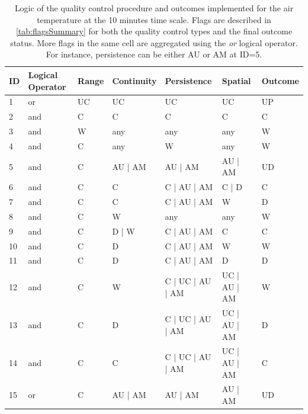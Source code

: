 \documentclass[authoryear,preprint,review,12pt]{elsarticle}
\begin{document}
\begin{table}[]
    \begin{scriptsize}
    \centering
    \begin{tabular}{l l l l l l l}
        \hline
        ID & Logical Operator & Range & Continuity & Persistence      & Spatial      & Outcome \\
        \hline
        1  & or               & UC    & UC         & UC               & UC           & UP \\
        2  & and              & C     & C          & C                & C            & C  \\
        3  & and              & W     & any        & any              & any          & W  \\
        4  & and              & C     & any        & W                & any          & W  \\
        5  & and              & C     & AU | AM    & AU | AM          & AU | AM      & UD \\
        6  & and              & C     & C          & C | AU | AM      & C | D        & C  \\
        7  & and              & C     & C          & C | AU | AM      & W            & D  \\
        8  & and              & C     & W          & any              & any          & W  \\
        9  & and              & C     & D | W      & C | AU | AM      & C            & C  \\
        10 & and              & C     & D          & C | AU | AM      & W            & W  \\
        11 & and              & C     & D          & C | AU | AM      & D            & D  \\
        12 & and              & C     & W          & C | UC | AU | AM & UC | AU | AM & W  \\
        13 & and              & C     & D          & C | UC | AU | AM & UC | AU | AM & D  \\
        14 & and              & C     & C          & C | UC | AU | AM & UC | AU | AM & C  \\
        15 & or               & C     & AU | AM    & AU | AM          & AU | AM      & UD \\
        \hline
    \end{tabular}
    \end{scriptsize}
    \caption{Logic of the quality control procedure and outcomes implemented for the air temperature at the 10 minutes time scale.
    Flags are described in \cref{tab:flagsSummary} for both the quality control types and the final outcome status.
    More flags in the same cell are aggregated using the \textit{or} logical operator.
    For instance, persistence can be either AU or AM at ID=5. }
    \label{tab:qcheck_m10_airT}
\end{table}
\end{document}
